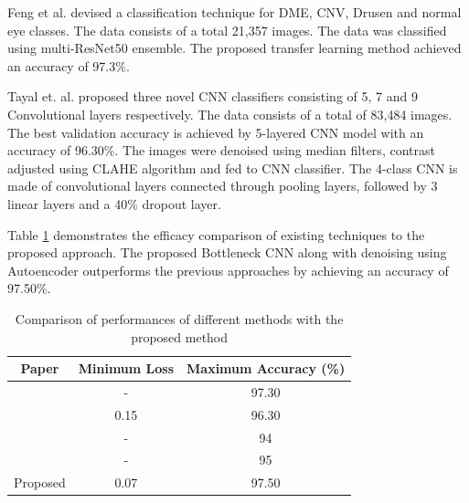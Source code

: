 \par
Feng et al. \cite{Li2019} devised a classification technique for DME, CNV, Drusen and normal eye classes. The data consists of a total 21,357 images. The data was classified using multi-ResNet50 ensemble. The proposed transfer learning method achieved an accuracy of 97.3\%.

\par
Tayal et. al.\cite{Tayal2022} proposed three novel CNN classifiers consisting of 5, 7 and 9 Convolutional layers respectively. The data consists of a total of 83,484 images. The best validation accuracy is achieved by 5-layered CNN model with an accuracy of 96.30\%. The images were denoised using median filters, contrast adjusted using CLAHE algorithm and fed to CNN classifier. The 4-class CNN is made of convolutional layers connected through pooling layers, followed by 3 linear layers and a 40\% dropout layer.

\par
Table \ref{table:discussion} demonstrates the efficacy comparison of existing techniques to the proposed approach. The proposed Bottleneck CNN along with denoising using Autoencoder outperforms the previous approaches by achieving an accuracy of 97.50\%.

\begin{table}[ht]
\centering
\caption{Comparison of performances of different methods with the proposed method}
\renewcommand{\arraystretch}{2} 
\begin{tabular}{|c|c|c|}
\hline
\textbf{Paper} & \textbf{Minimum Loss} & \textbf{Maximum Accuracy (\%)} \\ \hline
\cite{Li2019} & - & 97.30 \\ \hline
\cite{Tayal2022} & 0.15 & 96.30 \\ \hline
\cite{Maetschke2019} & - & 94 \\ \hline
\cite{Hussain2018} & - & 95 \\ \hline
Proposed & 0.07 & 97.50 \\ \hline
\end{tabular}
\label{table:discussion}
\end{table}

